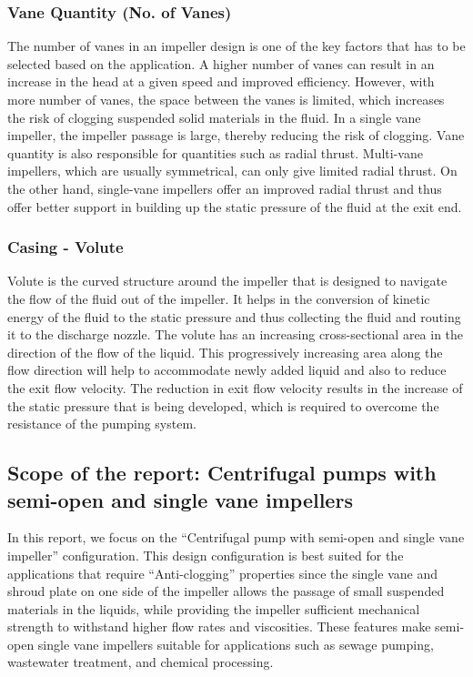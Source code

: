 \documentclass[11pt,a4paper]{scrartcl}
\begin{document}
\subsubsection{Vane Quantity (No. of Vanes)}
The number of vanes in an impeller design is one of the key factors that has to be selected based on the application. A higher number of vanes can result in an increase in the head at a given speed and improved efficiency. However, with more number of vanes, the space between the vanes is limited, which increases the risk of clogging suspended solid materials in the fluid. In a single vane impeller, the impeller passage is large, thereby reducing the risk of clogging. Vane quantity is also responsible for quantities such as radial thrust. Multi-vane impellers, which are usually symmetrical, can only give limited radial thrust. On the other hand, single-vane impellers offer an improved radial thrust and thus offer better support in building up the static pressure of the fluid at the exit end. 
\subsubsection{ Casing - Volute}
Volute is the curved structure around the impeller that is designed to navigate the flow of the fluid out of the impeller. It helps in the conversion of kinetic energy of the fluid to the static pressure and thus collecting the fluid and routing it to the discharge nozzle. The volute has an increasing cross-sectional area in the direction of the flow of the liquid. This progressively increasing area along the flow direction will help to accommodate newly added liquid and also to reduce the exit flow velocity. The reduction in exit flow velocity results in the increase of the static pressure that is being developed, which is required to overcome the resistance of the pumping system.

\subsection{Scope of the report: Centrifugal pumps with semi-open and single vane impellers }
In this report, we focus on the “Centrifugal pump with semi-open and single vane impeller” configuration. This design configuration is best suited for the applications that require “Anti-clogging” properties since the single vane and shroud plate on one side of the impeller allows the passage of small suspended materials in the liquids, while providing the impeller sufficient mechanical strength to withstand higher flow rates and viscosities. These features make semi-open single vane impellers suitable for applications such as sewage pumping, wastewater treatment, and chemical processing.  
\end{document}
